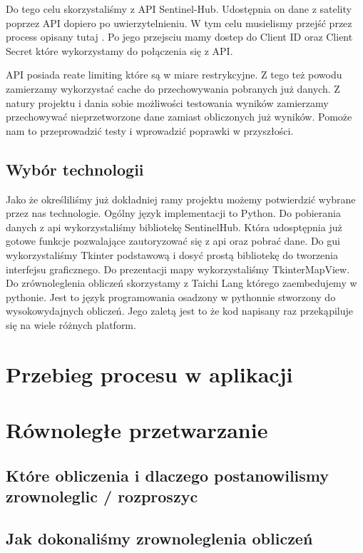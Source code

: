 \documentclass[12pt,a4paper]{article}
\begin{document}
Do tego celu skorzystaliśmy z API Sentinel-Hub. \cite{sentinel2_api_docs} 
Udostępnia on dane z satelity poprzez API dopiero po uwierzytelnieniu. 
W tym celu musielismy przejść przez process opisany tutaj \cite{sentinel2_api_docs_auth}.
Po jego przejsciu mamy dostep do Client ID oraz Client Secret które wykorzystamy do połączenia się z API.

API posiada reate limiting które są w miare restrykcyjne. \cite{sentinel2_api_auth_rate_limiting}
Z tego też powodu zamierzamy wykorzystać cache do przechowywania pobranych już danych.
Z natury projektu i dania sobie możliwości testowania wyników zamierzamy przechowywać nieprzetworzone dane zamiast obliczonych już wyników.
Pomoże nam to przeprowadzić testy i wprowadzić poprawki w przyszłości.

\subsection{Wybór technologii}

Jako że określiliśmy już dokładniej ramy projektu możemy potwierdzić wybrane przez nas technologie. 
Ogólny język implementacji to Python.
Do pobierania danych z api wykorzystaliśmy bibliotekę SentinelHub. Która udosptępnia już gotowe funkcje pozwalające zautoryzować się z api oraz pobrać dane.
Do gui wykorzystaliśmy Tkinter podstawową i dosyć prostą bibliotekę do tworzenia interfejsu graficznego.
Do prezentacji mapy wykorzystaliśmy TkinterMapView.
Do zrównoleglenia obliczeń skorzystamy z Taichi Lang \cite{taichi_lang_docs} którego zaembedujemy w pythonie.
Jest to język programowania osadzony w pythonnie stworzony do wysokowydajnych obliczeń.
Jego zaletą jest to że kod napisany raz przekąpiluje się na wiele różnych platform.



\section{Przebieg procesu w aplikacji}
\section{Równoległe przetwarzanie}
\subsection{Które obliczenia i dlaczego postanowilismy zrownoleglic / rozproszyc}
\subsection{Jak dokonaliśmy zrownoleglenia obliczeń}
\end{document}
